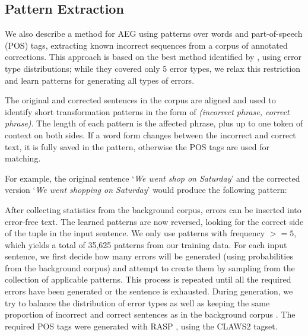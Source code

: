 \documentclass[11pt,letterpaper]{article}
\begin{document}
\subsection{Pattern Extraction}
\label{sec:pat}

We also describe a method for AEG using patterns over words and part-of-speech (POS) tags, extracting known incorrect sequences from a corpus of annotated corrections.
This approach is based on the best method identified by , using error type distributions; while they covered only 5 error types, we relax this restriction and learn patterns for generating all types of errors.


The original and corrected sentences in the corpus are aligned and used to identify short transformation patterns in the form of \textit{(incorrect phrase, correct phrase)}. The length of each pattern is the affected phrase, plus up to one token of context on both sides. If a word form changes between the incorrect and correct text, it is fully saved in the pattern, otherwise the POS tags are used for matching.

For example, the original sentence `\textit{We went shop on Saturday}' and the corrected version `\textit{We went shopping on Saturday}' would produce the following pattern:
\begin{center}
\end{center}


\noindent After collecting statistics from the background corpus, errors can be inserted into error-free text. The learned patterns are now reversed, looking for the correct side of the tuple in the input sentence. 
We only use patterns with frequency $>= 5$, which yields a total of 35,625 patterns from our training data. 
For each input sentence, we first decide how many errors will be generated (using probabilities from the background corpus) and attempt to create them by sampling from the collection of applicable patterns. This process is repeated until all the required errors have been generated or the sentence is exhausted. During generation, we try to balance the distribution of error types as well as keeping the same proportion of incorrect and correct sentences as in the background corpus \cite{UCAM-CL-TR-895}. The required POS tags were generated with RASP \cite{Briscoe2006}, using the CLAWS2 tagset.
\end{document}
